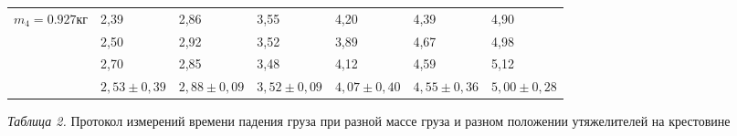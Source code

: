 \begin{center}
\begin{tabular}{|p{2.5cm}|p{2cm}|p{2cm}|p{2cm}|p{2cm}|p{2cm}|p{2cm}|}
        \hline
        \multirow{4}{*}{$m_4 = 0.927 \text{кг}$} &       2,39        &     2,86    &     3,55    &    4,20     &    4,39     &     4,90    \\
        \cline{2-7}
        &       2,50        &    2,92     &    3,52     &    3,89     &    4,67     &    4,98     \\
        \cline{2-7}
        &       2,70        &    2,85     &    3,48     &    4,12     &    4,59     &     5,12    \\
        \cline{2-7}
        &       $2,53 \pm 0,39$        &    $2,88 \pm 0,09$     &     $3,52 \pm 0,09$    &    $4,07 \pm 0,40$     &    $4,55 \pm 0,36$     &     $5,00 \pm 0,28$    \\
        \hline

    \end{tabular}

    \smallvspace

    \textit{Таблица 2.} Протокол измерений времени падения груза при разной
    массе груза и разном положении утяжелителей на крестовине
\end{center}
